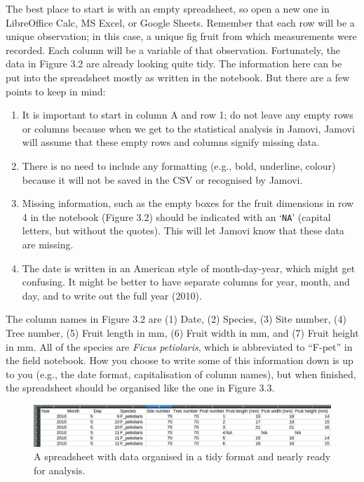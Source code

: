 \documentclass[
]{scrbook}
\providecommand{\tightlist}{%
  \setlength{\itemsep}{0pt}\setlength{\parskip}{0pt}}
\begin{document}
The best place to start is with an empty spreadsheet, so open a new one in LibreOffice Calc, MS Excel, or Google Sheets.
Remember that each row will be a unique observation; in this case, a unique fig fruit from which measurements were recorded.
Each column will be a variable of that observation.
Fortunately, the data in Figure 3.2 are already looking quite tidy.
The information here can be put into the spreadsheet mostly as written in the notebook.
But there are a few points to keep in mind:

\begin{enumerate}
\def\labelenumi{\arabic{enumi}.}
\tightlist
\item
  It is important to start in column A and row 1; do not leave any empty rows or columns because when we get to the statistical analysis in Jamovi, Jamovi will assume that these empty rows and columns signify missing data.
\item
  There is no need to include any formatting (e.g., bold, underline, colour) because it will not be saved in the CSV or recognised by Jamovi.
\item
  Missing information, such as the empty boxes for the fruit dimensions in row 4 in the notebook (Figure 3.2) should be indicated with an `\texttt{NA}' (capital letters, but without the quotes). This will let Jamovi know that these data are missing.
\item
  The date is written in an American style of month-day-year, which might get confusing. It might be better to have separate columns for year, month, and day, and to write out the full year (2010).
\end{enumerate}

The column names in Figure 3.2 are (1) Date, (2) Species, (3) Site number, (4) Tree number, (5) Fruit length in mm, (6) Fruit width in mm, and (7) Fruit height in mm.
All of the species are \emph{Ficus petiolaris}, which is abbreviated to ``F-pet'' in the field notebook.
How you choose to write some of this information down is up to you (e.g., the date format, capitalisation of column names), but when finished, the spreadsheet should be organised like the one in Figure 3.3.

\begin{figure}
\includegraphics[width=1\linewidth]{img/Ch1_Ex1a} \caption{A spreadsheet with data organised in a tidy format and nearly ready for analysis.}\label{fig:unnamed-chunk-10}
\end{figure}
\end{document}
